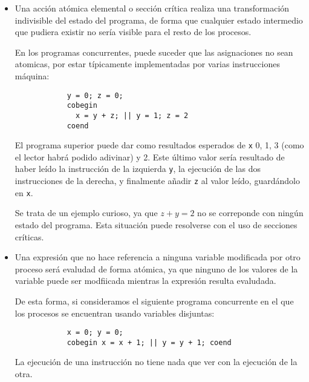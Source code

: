 \begin{itemize}
    \item Una acción atómica elemental o sección crítica realiza una transformación indivisible del estado del programa, de forma que cualquier estado intermedio que pudiera existir no sería visible para el resto de los procesos.

        En los programas concurrentes, puede suceder que las asignaciones no sean atomicas, por estar típicamente implementadas por varias instrucciones máquina:

        \begin{verbatim}
            y = 0; z = 0;
            cobegin
              x = y + z; || y = 1; z = 2
            coend
        \end{verbatim}
        El programa superior puede dar como resultados esperados de \verb|x| 0, 1, 3 (como el lector habrá podido adivinar) y 2. Este último valor sería resultado de haber leído la instrucción de la izquierda \verb|y|, la ejecución de las dos instrucciones de la derecha, y finalmente añadir \verb|z| al valor leído, guardándolo en \verb|x|.

        Se trata de un ejemplo curioso, ya que $z+y=2$ no se correponde con ningún estado del programa. Esta situación puede resolverse con el uso de secciones críticas.
        
    \item Una expresión que no hace referencia a ninguna variable modificada por otro proceso será evaludad de forma atómica, ya que ninguno de los valores de la variable puede ser modfiicada mientras la expresión resulta evaludada.

        De esta forma, si consideramos el siguiente programa concurrente en el que los procesos se encuentran usando variables disjuntas:
        \begin{verbatim}
            x = 0; y = 0;
            cobegin x = x + 1; || y = y + 1; coend
        \end{verbatim}
        La ejecución de una instrucción no tiene nada que ver con la ejecución de la otra.
\end{itemize}

